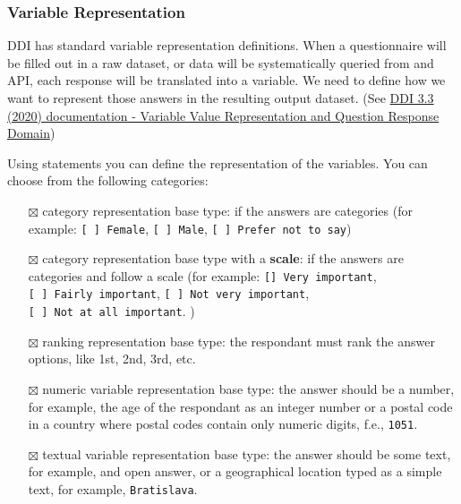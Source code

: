 \documentclass[
  letterpaper,
  DIV=11,
  numbers=noendperiod]{scrreprt}
\begin{document}
\subsubsection{Variable Representation}\label{variable-representation-1}

DDI has standard variable representation definitions. When a
questionnaire will be filled out in a raw dataset, or data will be
systematically queried from and API, each response will be translated
into a variable. We need to define how we want to represent those
answers in the resulting output dataset. (See
\href{https://ddi-lifecycle-documentation.readthedocs.io/en/latest/TechnicalGuide/Value\%20Representation\%20and\%20Response\%20Domain.html}{DDI
3.3 (2020) documentation - Variable Value Representation and Question
Response Domain})

Using statements you can define the representation of the variables. You
can choose from the following categories:

\begin{itemize}
\item[$\boxtimes$]
  category representation base type: if the answers are categories (for
  example: \texttt{{[}\ {]}\ Female}, \texttt{{[}\ {]}\ Male},
  \texttt{{[}\ {]}\ Prefer\ not\ to\ say})
\item[$\boxtimes$]
  category representation base type with a \textbf{scale}: if the
  answers are categories and follow a scale (for example:
  \texttt{{[}{]}\ Very\ important},
  \texttt{{[}\ {]}\ Fairly\ important},
  \texttt{{[}\ {]}\ Not\ very\ important},
  \texttt{{[}\ {]}\ Not\ at\ all\ important}. )
\item[$\boxtimes$]
  ranking representation base type: the respondant must rank the answer
  options, like 1st, 2nd, 3rd, etc.
\item[$\boxtimes$]
  numeric variable representation base type: the answer should be a
  number, for example, the age of the respondant as an integer number or
  a postal code in a country where postal codes contain only numeric
  digits, f.e., \texttt{1051}.
\item[$\boxtimes$]
  textual variable representation base type: the answer should be some
  text, for example, and open answer, or a geographical location typed
  as a simple text, for example, \texttt{Bratislava}.
\end{itemize}
\end{document}
